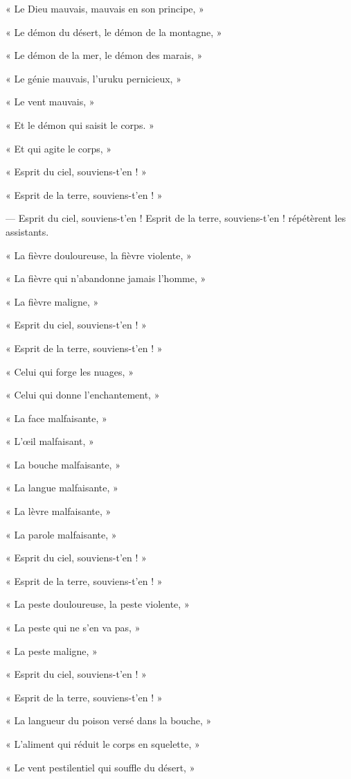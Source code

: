 \documentclass[a4paper, 11pt, oneside, polutonikogreek, french]{article}
\begin{document}
« Le Dieu mauvais, mauvais en son principe, »

« Le démon du désert, le démon de la montagne, »

« Le démon de la mer, le démon des marais, »

« Le génie mauvais, l'uruku pernicieux, »

« Le vent mauvais, »

« Et le démon qui saisit le corps. »

« Et qui agite le corps, »

« Esprit du ciel, souviens-t'en ! »

« Esprit de la terre, souviens-t'en ! »

--- Esprit du ciel, souviens-t'en ! Esprit de la terre, souviens-t'en ! répétèrent les assistants.

« La fièvre douloureuse, la fièvre violente, »

« La fièvre qui n'abandonne jamais l'homme, »

« La fièvre maligne, »

« Esprit du ciel, souviens-t'en ! »

« Esprit de la terre, souviens-t'en ! »

« Celui qui forge les nuages, »

« Celui qui donne l'enchantement, »

« La face malfaisante, »

« L'œil malfaisant, »

« La bouche malfaisante, »

« La langue malfaisante, »

« La lèvre malfaisante, »

« La parole malfaisante, »

« Esprit du ciel, souviens-t'en ! »

« Esprit de la terre, souviens-t'en ! »

« La peste douloureuse, la peste violente, »

« La peste qui ne s'en va pas, »

« La peste maligne, »

« Esprit du ciel, souviens-t'en ! »

« Esprit de la terre, souviens-t'en ! »

« La langueur du poison versé dans la bouche, »

« L'aliment qui réduit le corps en squelette, »

« Le vent pestilentiel qui souffle du désert, »
\end{document}

